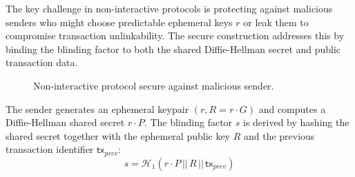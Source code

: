 \documentclass{article}
\begin{document}
The key challenge in non-interactive protocols is protecting against malicious senders who might choose predictable ephemeral keys $r$ or leak them to compromise transaction unlinkability. The secure construction addresses this by binding the blinding factor to both the shared Diffie-Hellman secret and public transaction data.

\begin{figure}[ht]
\centering
{}
\caption{Non-interactive protocol secure against malicious sender.}
\label{fig:protocol3}
\end{figure}

The sender generates an ephemeral keypair $(r, R = r \cdot G)$ and computes a Diffie-Hellman shared secret $r \cdot P$. The blinding factor $s$ is derived by hashing the shared secret together with the ephemeral public key $R$ and the previous transaction identifier $\mathsf{tx}_{prev}$:
$$s = \mathcal{H}_1(r \cdot P \,||\, R \,||\, \mathsf{tx}_{prev})$$
\end{document}
